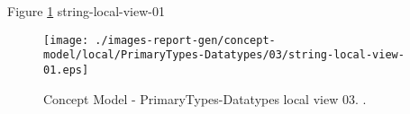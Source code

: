 Figure \ref{fig:lu.uni.lassy.excalibur.standard.specification.libraries-CM-view-local-PrimaryTypes-Datatypes-03} string-local-view-01



\begin{figure}[htbp] 
\label{fig:lu.uni.lassy.excalibur.standard.specification.libraries-CM}
\begin{center}
\texttt{[image: ./images-report-gen/concept-model/local/PrimaryTypes-Datatypes/03/string-local-view-01.eps]}
\end{center}
\caption[Concept Model - PrimaryTypes-Datatypes local view 03 - ]{Concept Model - PrimaryTypes-Datatypes local view 03. .}
\label{fig:lu.uni.lassy.excalibur.standard.specification.libraries-CM-view-local-PrimaryTypes-Datatypes-03}
\end{figure}
\vspace{0.5cm} 
